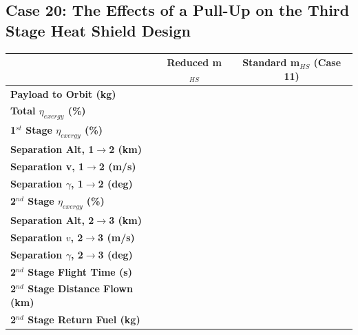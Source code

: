 \subsection{Case 20: The Effects of a Pull-Up on the Third Stage Heat Shield Design}\label{sec:TPSredesign}
\begin{table}[!ht]
	\centering
	
	\begin{tabular}{l c c} 
		& Reduced m$_{HS}$
		& Standard m$_{HS}$ (Case 11)
		\\
		\hline \textbf{Payload to Orbit (kg)}
		& \textbf{\PayloadToOrbitTPSreduced}
		& \textbf{\PayloadToOrbitStandard}
		\\
		\textbf{Total $\eta_{exergy}$ (\%)}
		& \textbf{\totalExergyEffTPSreduced}
		& \textbf{\totalExergyEffStandard}
		\\
		\hline 
		\textbf{1$^{st}$ Stage $\eta_{exergy}$ (\%)}
		& \textbf{\firstExergyEffTPSreduced}
		& \textbf{\firstExergyEffStandard}
		\\
		\textbf{Separation Alt, 1$\rightarrow$2 (km)}
		& \firstsecondSeparationAltTPSreduced
		& \firstsecondSeparationAltStandard
		\\
		\textbf{Separation v, 1$\rightarrow$2 (m/s)}
		& \firstsecondSeparationvTPSreduced
		& \firstsecondSeparationvStandard
		\\
		\textbf{Separation $\gamma$, 1$\rightarrow$2 (deg)}
		& \firstsecondSeparationgammaTPSreduced
		& \firstsecondSeparationgammaStandard
		\\
		\hline 
		\textbf{2$^{nd}$ Stage $\eta_{exergy}$ (\%)}
		& \textbf{\secondExergyEffTPSreduced}
		& \textbf{\secondExergyEffStandard}
		\\
		\textbf{Separation Alt, 2$\rightarrow$3 (km)}
		& \secondthirdSeparationAltTPSreduced
		& \secondthirdSeparationAltStandard
		\\
		\textbf{Separation $v$, 2$\rightarrow$3 (m/s)}
		& \secondthirdSeparationvTPSreduced
		& \secondthirdSeparationvStandard
		\\
		\textbf{Separation $\gamma$, 2$\rightarrow$3 (deg)}
		& \secondthirdSeparationgammaTPSreduced
		& \secondthirdSeparationgammaStandard
		\\
		\textbf{2$^{nd}$ Stage Flight Time (s)}
		& \secondFlightTimeTPSreduced
		& \secondFlightTimeStandard
		\\
		\textbf{2$^{nd}$ Stage Distance Flown (km)}
		& \SecondDistTPSreduced
		& \SecondDistStandard
		\\
		\textbf{2$^{nd}$ Stage Return Fuel (kg)}
		& \returnFuelTPSreduced

\end{tabular}
\end{table}
